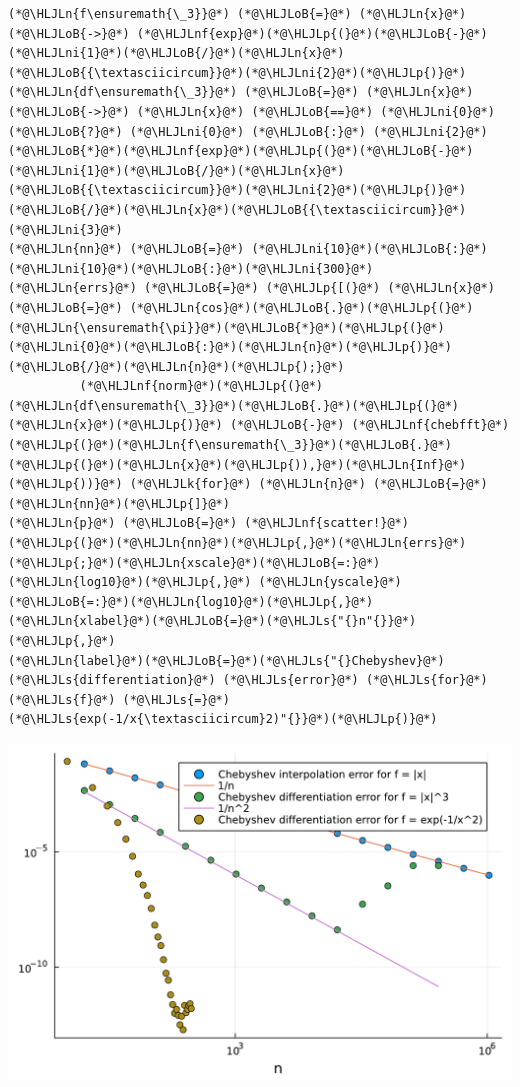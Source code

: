 \documentclass[12pt,a4paper]{article}
\newcommand{\HLJLk}[1]{\textcolor[RGB]{148,91,176}{\textbf{#1}}}
\newcommand{\HLJLn}[1]{#1}
\newcommand{\HLJLnf}[1]{\textcolor[RGB]{66,102,213}{#1}}
\newcommand{\HLJLs}[1]{\textcolor[RGB]{201,61,57}{#1}}
\newcommand{\HLJLni}[1]{\textcolor[RGB]{59,151,46}{#1}}
\newcommand{\HLJLoB}[1]{\textcolor[RGB]{102,102,102}{\textbf{#1}}}
\newcommand{\HLJLp}[1]{#1}
\begin{document}
\begin{lstlisting}
(*@\HLJLn{f\ensuremath{\_3}}@*) (*@\HLJLoB{=}@*) (*@\HLJLn{x}@*) (*@\HLJLoB{->}@*) (*@\HLJLnf{exp}@*)(*@\HLJLp{(}@*)(*@\HLJLoB{-}@*)(*@\HLJLni{1}@*)(*@\HLJLoB{/}@*)(*@\HLJLn{x}@*)(*@\HLJLoB{{\textasciicircum}}@*)(*@\HLJLni{2}@*)(*@\HLJLp{)}@*)
(*@\HLJLn{df\ensuremath{\_3}}@*) (*@\HLJLoB{=}@*) (*@\HLJLn{x}@*) (*@\HLJLoB{->}@*) (*@\HLJLn{x}@*) (*@\HLJLoB{==}@*) (*@\HLJLni{0}@*) (*@\HLJLoB{?}@*) (*@\HLJLni{0}@*) (*@\HLJLoB{:}@*) (*@\HLJLni{2}@*)(*@\HLJLoB{*}@*)(*@\HLJLnf{exp}@*)(*@\HLJLp{(}@*)(*@\HLJLoB{-}@*)(*@\HLJLni{1}@*)(*@\HLJLoB{/}@*)(*@\HLJLn{x}@*)(*@\HLJLoB{{\textasciicircum}}@*)(*@\HLJLni{2}@*)(*@\HLJLp{)}@*)(*@\HLJLoB{/}@*)(*@\HLJLn{x}@*)(*@\HLJLoB{{\textasciicircum}}@*)(*@\HLJLni{3}@*)
(*@\HLJLn{nn}@*) (*@\HLJLoB{=}@*) (*@\HLJLni{10}@*)(*@\HLJLoB{:}@*)(*@\HLJLni{10}@*)(*@\HLJLoB{:}@*)(*@\HLJLni{300}@*)
(*@\HLJLn{errs}@*) (*@\HLJLoB{=}@*) (*@\HLJLp{[(}@*) (*@\HLJLn{x}@*) (*@\HLJLoB{=}@*) (*@\HLJLn{cos}@*)(*@\HLJLoB{.}@*)(*@\HLJLp{(}@*)(*@\HLJLn{\ensuremath{\pi}}@*)(*@\HLJLoB{*}@*)(*@\HLJLp{(}@*)(*@\HLJLni{0}@*)(*@\HLJLoB{:}@*)(*@\HLJLn{n}@*)(*@\HLJLp{)}@*)(*@\HLJLoB{/}@*)(*@\HLJLn{n}@*)(*@\HLJLp{);}@*)
          (*@\HLJLnf{norm}@*)(*@\HLJLp{(}@*)(*@\HLJLn{df\ensuremath{\_3}}@*)(*@\HLJLoB{.}@*)(*@\HLJLp{(}@*)(*@\HLJLn{x}@*)(*@\HLJLp{)}@*) (*@\HLJLoB{-}@*) (*@\HLJLnf{chebfft}@*)(*@\HLJLp{(}@*)(*@\HLJLn{f\ensuremath{\_3}}@*)(*@\HLJLoB{.}@*)(*@\HLJLp{(}@*)(*@\HLJLn{x}@*)(*@\HLJLp{)),}@*)(*@\HLJLn{Inf}@*)(*@\HLJLp{))}@*) (*@\HLJLk{for}@*) (*@\HLJLn{n}@*) (*@\HLJLoB{=}@*) (*@\HLJLn{nn}@*)(*@\HLJLp{]}@*)
(*@\HLJLn{p}@*) (*@\HLJLoB{=}@*) (*@\HLJLnf{scatter!}@*)(*@\HLJLp{(}@*)(*@\HLJLn{nn}@*)(*@\HLJLp{,}@*)(*@\HLJLn{errs}@*)(*@\HLJLp{;}@*)(*@\HLJLn{xscale}@*)(*@\HLJLoB{=:}@*)(*@\HLJLn{log10}@*)(*@\HLJLp{,}@*) (*@\HLJLn{yscale}@*)(*@\HLJLoB{=:}@*)(*@\HLJLn{log10}@*)(*@\HLJLp{,}@*)(*@\HLJLn{xlabel}@*)(*@\HLJLoB{=}@*)(*@\HLJLs{"{}n"{}}@*)(*@\HLJLp{,}@*)
(*@\HLJLn{label}@*)(*@\HLJLoB{=}@*)(*@\HLJLs{"{}Chebyshev}@*) (*@\HLJLs{differentiation}@*) (*@\HLJLs{error}@*) (*@\HLJLs{for}@*) (*@\HLJLs{f}@*) (*@\HLJLs{=}@*) (*@\HLJLs{exp(-1/x{\textasciicircum}2)"{}}@*)(*@\HLJLp{)}@*)
\end{lstlisting}

\includegraphics[width=\linewidth]{jl_P71Faz/Chapter3_21_1.pdf}
\end{document}
